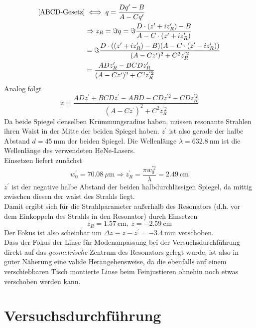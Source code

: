 \documentclass[11pt,a4paper,oneside]{scrartcl}
\begin{document}
\begin{align}
\ref{ABCD-Gesetz}& \iff q = \frac{Dq^\prime-B}{A-Cq^\prime}\\ & \Rightarrow z_R=\Im{q}=\Im{\frac{D\cdot (z^\prime+iz_R^\prime)-B}{A-C\cdot(z^\prime+iz_R^\prime)}}\\ \quad&=\Im{\frac{D\cdot ((z^\prime+iz_R^\prime)-B)(A-C\cdot(z^\prime-iz_R^\prime))}{(A-Cz^\prime)^2+C^2z_R^{^\prime 2}}}\\ \quad&
=\frac{ADz_R^\prime-BCDz_R^\prime}{(A-Cz^\prime)^2+C^2z_R^{^\prime 2}}
\end{align}
Analog folgt 
\begin{equation}
z=\frac{ADz^\prime+BCDz^\prime-ABD-CDz^{\prime 2}-CDz_R^{\prime 2}}{(A-Cz^\prime)^2+C^2z_R^{^\prime 2}}
\end{equation}
Da beide Spiegel denselben Krümmungsradius haben, müssen resonante Strahlen ihren Waist in der Mitte der beiden Spiegel haben. $z^\prime$ ist also gerade der halbe Abstand $d=45\ \mathrm{mm}$ der beiden Spiegel. Die Wellenlänge $\lambda=632.8\ \mathrm{nm}$ ist die Wellenlänge des verwendeten HeNe-Lasers. \\
Einsetzen liefert zunächst
\begin{equation}
w_0^\prime = 70.08\ \mu\mathrm m\Rightarrow z_R^\prime = \frac{\pi w_0^{\prime 2}}{\lambda} = 2.49\ \mathrm{cm}
\end{equation}
 $z^\prime$ ist der negative halbe Abstand der beiden halbdurchlässigen Spiegel, da mittig zwischen diesen der waist des Strahls liegt. \\
Damit ergibt sich für die Strahlparameter außerhalb des Resonators (d.h. vor dem Einkoppeln des Strahls in den Resonator) durch Einsetzen
\begin{equation}
z_R = 1.57\ \mathrm{cm},\ z = -2.59\ \mathrm{cm}
\end{equation}
Der Fokus ist also scheinbar um $\Delta z\equiv z-z^\prime = -3.4\ \mathrm{mm}$ verschoben. \\
Dass der Fokus der Linse für Modenanpassung bei der Versuchsdurchführung direkt auf das \emph{geometrische} Zentrum des Resonators gelegt wurde, ist also in guter Näherung eine valide Herangehensweise, da die ebenfalls auf einem verschiebbaren Tisch montierte Linse beim Feinjustieren ohnehin noch etwas verschoben werden kann.
\section{Versuchsdurchführung}
\end{document}
